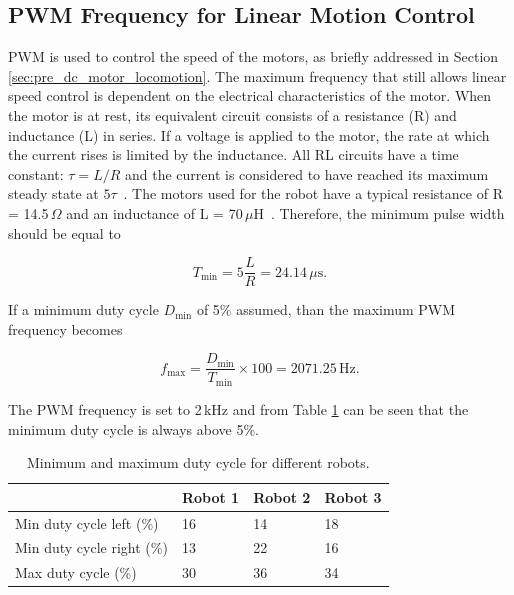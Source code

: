 \subsection{PWM Frequency for Linear Motion Control}
\label{sec:cd_pwm_frequency}

PWM is used to control the speed of the motors, as briefly addressed in Section \ref{sec:pre_dc_motor_locomotion}.
The maximum frequency that still allows linear speed control is dependent on the electrical characteristics of the motor.
When the motor is at rest, its equivalent circuit consists of a resistance (R) and inductance (L) in series.
If a voltage is applied to the motor, the rate at which the current rises is limited by the inductance. 
All RL circuits have a time constant: $\tau = L / R$ and the current is considered to have reached its maximum steady state at $5\tau$~\cite{pmw_linear_motion_2017}. 
The motors used for the robot have a typical resistance of R = 14.5\,$\Omega$ and an inductance of L = 70\,$\mu$H~\cite{gearmotor_206-110_2017}.
Therefore, the minimum pulse width should be equal to

\begin{equation}
T_{\min} = 5 \frac{L}{R} = 24.14\,\mu\text{s}.
\end{equation}

\noindent
If a minimum duty cycle $D_{\min}$ of 5\% assumed, than the maximum PWM frequency becomes

\begin{equation}
f_{\max} = \frac{D_{\min}}{T_{\min}}\times 100 = 2071.25\,\text{Hz}.
\end{equation}

\noindent
The PWM frequency is set to 2\,kHz and from Table \ref{tab:duty_cycle} can be seen that the minimum duty cycle is always above 5\%.

\begin{table}[t]
	\centering
	\caption{Minimum and maximum duty cycle for different robots.}
	\label{tab:duty_cycle}
	\begin{tabular}{|l||l|l|l|} 
		\hline
						          & Robot 1 & Robot 2 & Robot 3 \\
		\hline \hline
 		Min duty cycle left (\%)  & 16      & 14      & 18      \\
		Min duty cycle right (\%) & 13      & 22      & 16      \\
		Max duty cycle (\%)       & 30      & 36      & 34	    \\
		\hline
	\end{tabular}
\end{table}

